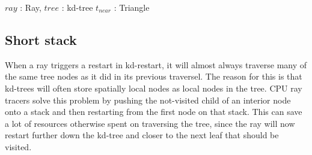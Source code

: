 \begin{algorithm}
  \caption{KD Restart}
  \label{alg:KDRestart}
  \begin{algorithmic}
              {$ray$ : Ray, $tree$ : kd-tree}
              {$t_{near}$ : Triangle}{
                    \ELSE
                    \ENDIF
                  \ENDWHILE
                  \ELSE
                  \ENDIF
                \ENDWHILE
              }
  \end{algorithmic}
\end{algorithm}

\subsection{Short stack}\label{sec:shortStack}


When a ray triggers a restart in kd-restart, it will almost always traverse many
of the same tree nodes as it did in its previous traversel. The reason for this
is that kd-trees will often store spatially local nodes as local nodes in the
tree. CPU ray tracers solve this problem by pushing the not-visited child of an
interior node onto a stack and then restarting from the first node on that
stack. This can save a lot of resources otherwise spent on traversing the tree,
since the ray will now restart further down the kd-tree and closer to the next
leaf that should be visited.

